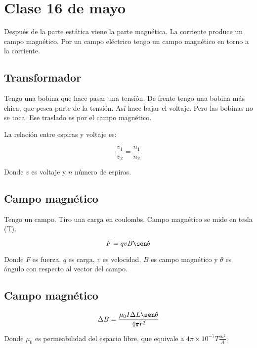 \section{Clase 16 de mayo}

Después de la parte estática viene la parte magnética.
La corriente produce un campo magnético.
Por un campo eléctrico tengo un campo magnético en torno a la corriente.

\subsection{Transformador}

Tengo una bobina que hace pasar una tensión.
De frente tengo una bobina más chica,
que pesca parte de la tensión.
Así hace bajar el voltaje.
Pero las bobinas no se toca.
Ese traslado es por el campo magnético.

La relación entre espiras y voltaje es:

\begin{equation*}
    \frac{v_1}{v_2} = \frac{n_1}{n_2}
\end{equation*}

Donde \(v\) es voltaje y \(n\) número de espiras.

\subsection{Campo magnético}

Tengo un campo.
Tiro una carga en coulombs.
Campo magnético se mide en tesla (T).

\begin{equation*}
    F = qvB\sen\theta
\end{equation*}

Donde \(F\) es fuerza,
\(q\) es carga,
\(v\) es velocidad,
\(B\) es campo magnético
y \(\theta\) es ángulo con respecto al vector del campo.

\subsection{Campo magnético}

\begin{equation*}
    \Delta B =  \frac{\mu_0I\Delta L \sen\theta}{4\pi r^{2}}
\end{equation*}

Donde \(\mu_0\) es permeabilidad del espacio libre,
que equivale a \(4\pi\times10^{-7}T\frac{m^{2}}{A}\);


